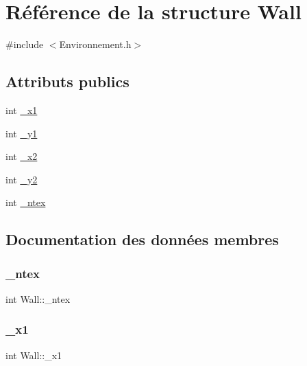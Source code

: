 \hypertarget{structWall}{}\section{Référence de la structure Wall}
\label{structWall}


{\ttfamily \#include $<$Environnement.\+h$>$}

\subsection*{Attributs publics}
\begin{DoxyCompactItemize}
\item 
int \hyperlink{structWall_acb9b4e999c8f035543f7f3b4ed99cfe5}{\+\_\+x1}
\item 
int \hyperlink{structWall_aa79f9d9da68a74b10ceaf988c8d46a5e}{\+\_\+y1}
\item 
int \hyperlink{structWall_a0b396b774da28ae1e5d3b2f4ff32eff1}{\+\_\+x2}
\item 
int \hyperlink{structWall_a8a362d4ca002122ba47b2d06d770bcd1}{\+\_\+y2}
\item 
int \hyperlink{structWall_a0ded071e2fbfc366e2cd136b46cfff18}{\+\_\+ntex}
\end{DoxyCompactItemize}


\subsection{Documentation des données membres}
\mbox{\label{structWall_a0ded071e2fbfc366e2cd136b46cfff18}} 
\subsubsection{\texorpdfstring{\+\_\+ntex}{\_ntex}}
{\footnotesize\ttfamily int Wall\+::\+\_\+ntex}

\mbox{\label{structWall_acb9b4e999c8f035543f7f3b4ed99cfe5}} 
\subsubsection{\texorpdfstring{\+\_\+x1}{\_x1}}
{\footnotesize\ttfamily int Wall\+::\+\_\+x1}

\mbox{\label{structWall_a0b396b774da28ae1e5d3b2f4ff32eff1}} 
